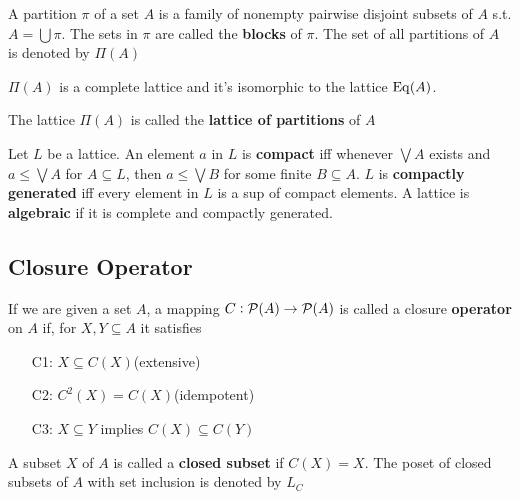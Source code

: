 \documentclass[11pt]{article}
\begin{document}
\begin{definition}[]
A partition \(\pi\) of a set \(A\) is a family of nonempty pairwise disjoint subsets
of \(A\) s.t. \(A=\bigcup\pi\). The sets in \(\pi\) are called the \textbf{blocks} of \(\pi\). The
set of all partitions of \(A\) is denoted by \(\Pi(A)\)
\end{definition}

\begin{theorem}[]
\(\Pi(A)\) is a complete lattice and it's isomorphic to the lattice \(\operatorname{Eq}(A)\).
\end{theorem}

\begin{definition}[]
The lattice \(\Pi(A)\) is called the \textbf{lattice of partitions} of \(A\)
\end{definition}


 
\begin{definition}[]
Let \(L\) be a lattice. An element \(a\) in \(L\) is \textbf{compact} iff whenever 
\(\bigvee A\) exists and \(a\le\bigvee A\) for \(A\subseteq L\), then 
\(a\le\bigvee B\) for some finite \(B\subseteq A\). \(L\) is \textbf{compactly
generated} iff every element in \(L\) is a sup of compact elements. A lattice is
\textbf{algebraic} if it is complete and compactly generated.
\end{definition}

\subsection{Closure Operator}
\label{sec:orgf3e1735}
\begin{definition}[]
If we are given a set \(A\), a mapping \(C:\mathcal{P}(A)\to\mathcal{P}(A)\) is called a
closure \textbf{operator} on \(A\) if, for \(X,Y\subseteq A\) it satisfies
\begin{itemize}
\item[C1:] \(X\subseteq C(X)\)\hspace*{\fill}(extensive)
\item[C2:] \(C^2(X)=C(X)\)\hspace*{\fill}(idempotent)
\item[C3:] \(X\subseteq Y\) implies \(C(X)\subseteq C(Y)\)
\end{itemize}

A subset \(X\) of \(A\) is called a \textbf{closed subset} if \(C(X)=X\). The poset of
closed subsets of \(A\) with set inclusion is denoted by \(L_C\)
\end{definition}
\end{document}
